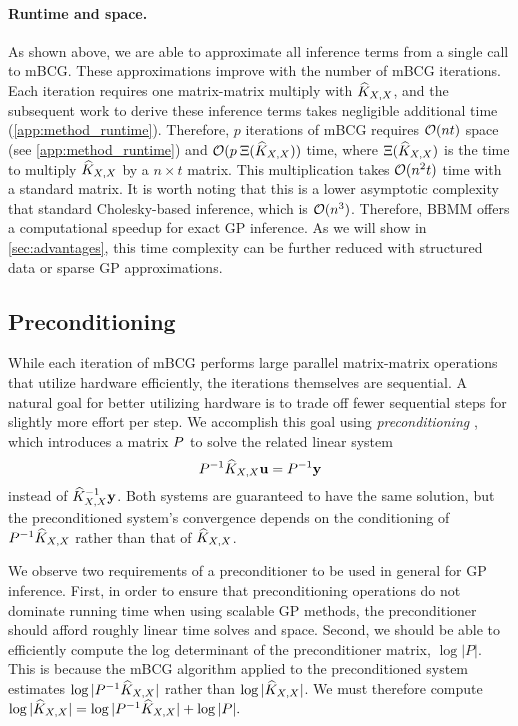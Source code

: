 \paragraph{Runtime and space.}
As shown above, we are able to approximate all inference terms from a single call to mBCG.
These approximations improve with the number of mBCG iterations.
Each iteration requires one matrix-matrix multiply with $\widehat{K}_{X,X}$, and the subsequent work to derive these inference terms takes negligible additional time (\autoref{app:method_runtime}).
Therefore, $p$ iterations of mBCG requires $\bigo{nt}$ space (see \autoref{app:method_runtime}) and $\bigo{p \: \mmm{\trainK}}$ time,
where $\Xi (\widehat{K}_{X,X})$ is the time to multiply $\widehat{K}_{X,X}$ by a $n \times t$ matrix.
This multiplication takes $\bigo{n^2 t}$ time with a standard matrix.
It is worth noting that this is a lower asymptotic complexity that standard Cholesky-based inference, which is $\bigo{n^3}$.
Therefore, BBMM offers a computational speedup for exact GP inference.
As we will show in \autoref{sec:advantages}, this time complexity can be further reduced with structured data or sparse GP approximations.
%
\subsection{Preconditioning}
\label{sec:preconditioning}
While each iteration of mBCG performs large parallel matrix-matrix operations that utilize hardware efficiently, the iterations themselves are sequential.
A natural goal for better utilizing hardware is to trade off fewer sequential steps for slightly more effort per step.
We accomplish this goal using \emph{preconditioning} \cite{golub2012matrix,saad2003iterative,demmel1997applied,van2003iterative}, which introduces a matrix $P$ to solve the related linear system
\begin{equation*}
  P^{-1} \widehat{K}_{X,X} \mathbf{u} = P^{-1}\mathbf{y}
\end{equation*}
instead of $\widehat{K}_{X,X}^{-1} \mathbf{y}$.
Both systems are guaranteed to have the same solution, but the preconditioned system's convergence depends on the conditioning of $P^{-1}\widehat{K}_{X,X}$ rather than that of $\widehat{K}_{X,X}$.

We observe two requirements of a preconditioner to be used in general for GP inference. First, in order to ensure that preconditioning operations do not dominate running time when using scalable GP methods, the preconditioner should afford roughly linear time solves and space. Second, we should be able to efficiently compute the log determinant of the preconditioner matrix, $\log \vert P \vert$. This is because the mBCG algorithm applied to the preconditioned system estimates $\log \vert P^{-1}\widehat{K}_{X,X} \vert$ rather than $\log \vert \widehat{K}_{X,X} \vert$. We must therefore compute
$
  \label{eq:logdet_adjusted}
  \log \vert \widehat{K}_{X,X} \vert = \log \vert P^{-1}\widehat{K}_{X,X} \vert + \log \vert P \vert.
$

